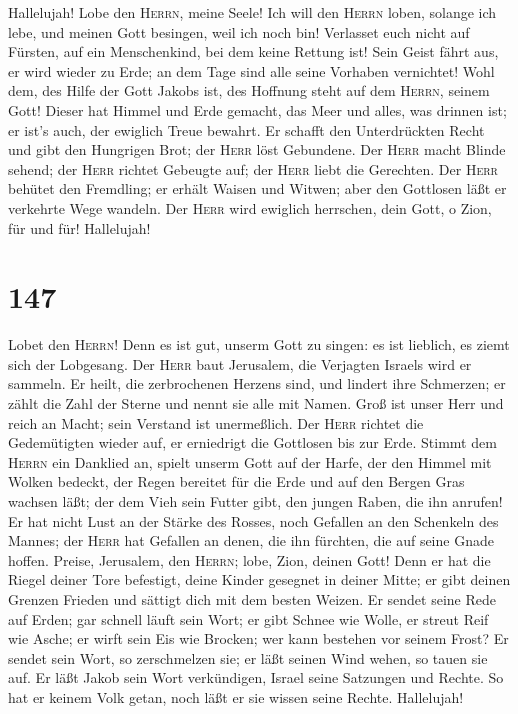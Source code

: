  Hallelujah! Lobe den \textsc{Herrn}, meine Seele!
 Ich will den \textsc{Herrn} loben, solange ich lebe, und
meinen Gott besingen, weil ich noch bin!  Verlasset euch
nicht auf Fürsten, auf ein Menschenkind, bei dem keine Rettung ist!
 Sein Geist fährt aus, er wird wieder zu Erde; an dem Tage
sind alle seine Vorhaben vernichtet!  Wohl dem, des Hilfe
der Gott Jakobs ist, des Hoffnung steht auf dem \textsc{Herrn}, seinem
Gott!  Dieser hat Himmel und Erde gemacht, das Meer und
alles, was drinnen ist; er ist's auch, der ewiglich Treue bewahrt.
 Er schafft den Unterdrückten Recht und gibt den Hungrigen
Brot; der \textsc{Herr} löst Gebundene.  Der \textsc{Herr}
macht Blinde sehend; der \textsc{Herr} richtet Gebeugte auf; der
\textsc{Herr} liebt die Gerechten.  Der \textsc{Herr}
behütet den Fremdling; er erhält Waisen und Witwen; aber den Gottlosen
läßt er verkehrte Wege wandeln.  Der \textsc{Herr} wird
ewiglich herrschen, dein Gott, o Zion, für und für! Hallelujah!

\hypertarget{section-146}{%
\section{147}\label{section-146}}

 Lobet den \textsc{Herrn}! Denn es ist gut, unserm Gott zu
singen: es ist lieblich, es ziemt sich der Lobgesang.  Der
\textsc{Herr} baut Jerusalem, die Verjagten Israels wird er sammeln.
 Er heilt, die zerbrochenen Herzens sind, und lindert ihre
Schmerzen;  er zählt die Zahl der Sterne und nennt sie
alle mit Namen.  Groß ist unser Herr und reich an Macht;
sein Verstand ist unermeßlich.  Der \textsc{Herr} richtet
die Gedemütigten wieder auf, er erniedrigt die Gottlosen bis zur Erde.
 Stimmt dem \textsc{Herrn} ein Danklied an, spielt unserm
Gott auf der Harfe,  der den Himmel mit Wolken bedeckt,
der Regen bereitet für die Erde und auf den Bergen Gras wachsen läßt;
 der dem Vieh sein Futter gibt, den jungen Raben, die ihn
anrufen!  Er hat nicht Lust an der Stärke des Rosses,
noch Gefallen an den Schenkeln des Mannes;  der
\textsc{Herr} hat Gefallen an denen, die ihn fürchten, die auf seine
Gnade hoffen.  Preise, Jerusalem, den \textsc{Herrn};
lobe, Zion, deinen Gott!  Denn er hat die Riegel deiner
Tore befestigt, deine Kinder gesegnet in deiner Mitte; 
er gibt deinen Grenzen Frieden und sättigt dich mit dem besten Weizen.
 Er sendet seine Rede auf Erden; gar schnell läuft sein
Wort;  er gibt Schnee wie Wolle, er streut Reif wie
Asche;  er wirft sein Eis wie Brocken; wer kann bestehen
vor seinem Frost?  Er sendet sein Wort, so zerschmelzen
sie; er läßt seinen Wind wehen, so tauen sie auf.  Er
läßt Jakob sein Wort verkündigen, Israel seine Satzungen und Rechte.
 So hat er keinem Volk getan, noch läßt er sie wissen
seine Rechte. Hallelujah!

